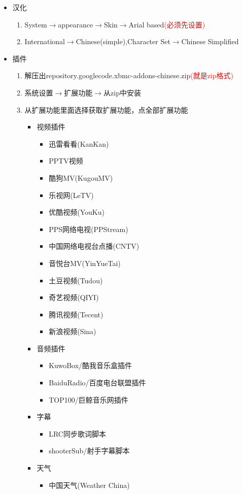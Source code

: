 \begin{itemize}
\item 汉化
\begin{enumerate}
\item System$\rightarrow{}$appearance$\rightarrow{}$Skin$\rightarrow{}$Arial based\textcolor{red}{(必须先设置)}
\item International$\rightarrow{}$Chinese(simple),Character Set$\rightarrow{}$Chinese Simplified
\end{enumerate}
\item 插件
\begin{enumerate}
\item 解压出repository.googlecode.xbmc-addons-chinese.zip\textcolor{red}{(就是zip格式)}
\item 系统设置$\rightarrow{}$扩展功能$\rightarrow{}$从zip中安装
\item 从扩展功能里面选择获取扩展功能，点全部扩展功能
\begin{itemize}
\item 视频插件
\begin{itemize}
\item 迅雷看看(KanKan)
\item PPTV视频
\item 酷狗MV(KugouMV)
\item 乐视网(LeTV)
\item 优酷视频(YouKu)
\item PPS网络电视(PPStream)
\item 中国网络电视台点播(CNTV)
\item 音悦台MV(YinYueTai)
\item 土豆视频(Tudou)
\item 奇艺视频(QIYI)
\item 腾讯视频(Tecent)
\item 新浪视频(Sina)
\end{itemize}
\item 音频插件
\begin{itemize}
\item KuwoBox/酷我音乐盒插件
\item BaiduRadio/百度电台联盟插件
\item TOP100/巨鲸音乐网插件
\end{itemize}
\item 字幕
\begin{itemize}
\item LRC同步歌词脚本
\item shooterSub/射手字幕脚本
\end{itemize}
\item 天气
\begin{itemize}
\item 中国天气(Weather China)
\end{itemize}
\end{itemize}
\end{enumerate}
\end{itemize}





